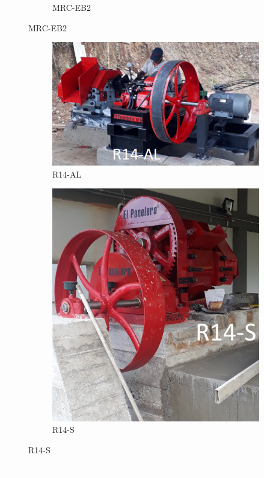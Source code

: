 \documentclass{article}%
\begin{document}
\begin{figure}[h!]
\begin{subfigure}{0.33\linewidth}
\caption{MRC{-}EB2}%
\end{subfigure}%
\linebreak%
\newpage%
\end{figure}

%


\begin{figure}[h!]%
\begin{subfigure}{0.33\linewidth}%
\includegraphics[width=0.95\linewidth]{Molinos/R14-AL.jpg}%
\caption{R14{-}AL}%
\end{subfigure}%
\begin{subfigure}{0.33\linewidth}%
\includegraphics[width=0.95\linewidth]{Molinos/R14-S.jpg}%
\caption{R14{-}S}%
\end{subfigure}%
\linebreak%
\newpage%
\end{figure}

%
\newpage%
\textcolor{white}{ 
HH
}%
\newpage%
\end{document}
